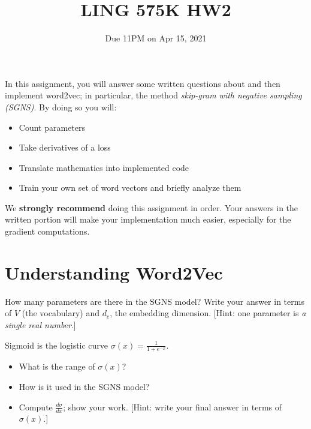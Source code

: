 \documentclass[11pt]{article}
\begin{document}
\title{LING 575K HW2}
\date{\vspace{-0.2in}Due 11PM on Apr 15, 2021}
\maketitle


In this assignment, you will answer some written questions about and then implement word2vec; in particular, the method \emph{skip-gram with negative sampling (SGNS)}.  By doing so you will:
\begin{itemize}
  \item Count parameters
  \item Take derivatives of a loss
  \item Translate mathematics into implemented code
  \item Train your own set of word vectors and briefly analyze them
\end{itemize}
We \textbf{strongly recommend} doing this assignment in order.  Your answers in the written portion will make your implementation much easier, especially for the gradient computations.

\section{Understanding Word2Vec}

  How many parameters are there in the SGNS model?  Write your answer in terms of $V$ (the vocabulary) and $d_e$, the embedding dimension.  [Hint: one parameter is \emph{a single real number}.]


\vspace{2em}
  Sigmoid is the logistic curve $\sigma(x) = \frac{1}{1+e^{-x}}$.
\begin{itemize}
  \item What is the range of $\sigma(x)$?
  \item How is it used in the SGNS model?
  \item Compute $\frac{d\sigma}{dx}$; show your work.  [Hint: write your final answer in terms of $\sigma(x)$.]
\end{itemize}
\end{document}
